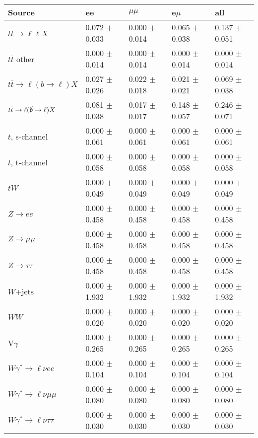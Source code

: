 \begin{tabular}{l | l l l l}
\hline\hline
 Source  &  ee  &  $\mu\mu$  &  e$\mu$  &  all \\
\hline
$t\overline{t}\rightarrow \ell\ell X$ &  0.072 $\pm$  0.033 &  0.000 $\pm$  0.014 &  0.065 $\pm$  0.038 &  0.137 $\pm$  0.051\\
$t\overline{t}$ other &  0.000 $\pm$  0.014 &  0.000 $\pm$  0.014 &  0.000 $\pm$  0.014 &  0.000 $\pm$  0.014\\
$t\overline{t}\rightarrow \ell(b\rightarrow \ell)X$ &  0.027 $\pm$  0.026 &  0.022 $\pm$  0.018 &  0.021 $\pm$  0.021 &  0.069 $\pm$  0.038\\
$t\overline{t}\rightarrow \ell(\slashed{b}\rightarrow \ell)X$ &  0.081 $\pm$  0.038 &  0.017 $\pm$  0.017 &  0.148 $\pm$  0.057 &  0.246 $\pm$  0.071\\
\hline
$t$, s-channel &  0.000 $\pm$  0.061 &  0.000 $\pm$  0.061 &  0.000 $\pm$  0.061 &  0.000 $\pm$  0.061\\
$t$, t-channel &  0.000 $\pm$  0.058 &  0.000 $\pm$  0.058 &  0.000 $\pm$  0.058 &  0.000 $\pm$  0.058\\
$tW$ &  0.000 $\pm$  0.049 &  0.000 $\pm$  0.049 &  0.000 $\pm$  0.049 &  0.000 $\pm$  0.049\\
\hline
$Z\rightarrow ee$ &  0.000 $\pm$  0.458 &  0.000 $\pm$  0.458 &  0.000 $\pm$  0.458 &  0.000 $\pm$  0.458\\
$Z\rightarrow\mu\mu$ &  0.000 $\pm$  0.458 &  0.000 $\pm$  0.458 &  0.000 $\pm$  0.458 &  0.000 $\pm$  0.458\\
$Z\rightarrow\tau\tau$ &  0.000 $\pm$  0.458 &  0.000 $\pm$  0.458 &  0.000 $\pm$  0.458 &  0.000 $\pm$  0.458\\
$W$+jets &  0.000 $\pm$  1.932 &  0.000 $\pm$  1.932 &  0.000 $\pm$  1.932 &  0.000 $\pm$  1.932\\
$WW$ &  0.000 $\pm$  0.020 &  0.000 $\pm$  0.020 &  0.000 $\pm$  0.020 &  0.000 $\pm$  0.020\\
\hline
V$\gamma$ &  0.000 $\pm$  0.265 &  0.000 $\pm$  0.265 &  0.000 $\pm$  0.265 &  0.000 $\pm$  0.265\\
$W\gamma^{*}\rightarrow\ell\nu e e$ &  0.000 $\pm$  0.104 &  0.000 $\pm$  0.104 &  0.000 $\pm$  0.104 &  0.000 $\pm$  0.104\\
$W\gamma^{*}\rightarrow\ell\nu\mu\mu$ &  0.000 $\pm$  0.080 &  0.000 $\pm$  0.080 &  0.000 $\pm$  0.080 &  0.000 $\pm$  0.080\\
$W\gamma^{*}\rightarrow\ell\nu\tau\tau$ &  0.000 $\pm$  0.030 &  0.000 $\pm$  0.030 &  0.000 $\pm$  0.030 &  0.000 $\pm$  0.030\\

\end{tabular}
